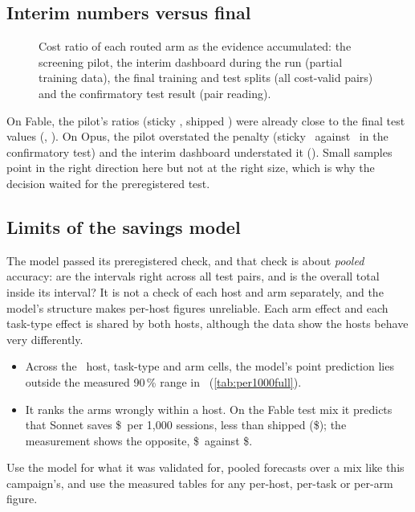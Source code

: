 \subsection{Interim numbers versus final}\label{sec:interim}

\begin{figure}[htbp]
\centering
{}\par\smallskip

\caption{Cost ratio of each routed arm as the evidence accumulated: the screening pilot, the interim dashboard
during the run (partial training data), the final training and test splits (all cost-valid pairs) and the
confirmatory test result (pair reading).}
\label{fig:interim}
\end{figure}

On Fable, the pilot's ratios (sticky \PilotFableSticky, shipped \PilotFableShipped) were already close to the
final test values (\FinalTestFableSticky, \FinalTestFableShipped). On Opus, the pilot overstated the
penalty (sticky \PilotOpusSticky\ against \CfOpusStickyPairTwo\ in the confirmatory test) and the interim
dashboard understated it (\InterimOpusSticky). Small samples point in the right direction here but not at the
right size, which is why the decision waited for the preregistered test.

\subsection{Limits of the savings model}\label{sec:modellimits}

The model passed its preregistered check, and that check is about \emph{pooled} accuracy: are the intervals
right across all test pairs, and is the overall total inside its interval? It is not a check of each host and
arm separately, and the model's structure makes per-host figures unreliable. Each arm effect and each
task-type effect is shared by both hosts, although the data show the hosts behave very differently.
\begin{itemize}
  \item Across the \ModelCells\ host, task-type and arm cells, the model's point prediction lies outside the
    measured 90\,\% range in \ModelOutside\ (\cref{tab:per1000full}).
  \item It ranks the arms wrongly within a host. On the Fable test mix it predicts that Sonnet saves
    \$\TestMixFableSonnetModel\ per 1,000 sessions, less than shipped (\$\TestMixFableShippedModel); the
    measurement shows the opposite, \$\TestMixFableSonnetObs\ against \$\TestMixFableShippedObs.
\end{itemize}
Use the model for what it was validated for, pooled forecasts over a mix like this campaign's, and use the
measured tables for any per-host, per-task or per-arm figure.
